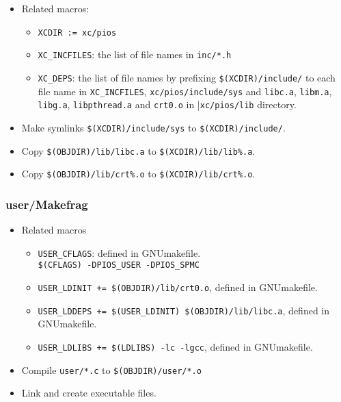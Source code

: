 \begin{itemize}
\item Related macros: 
\begin{itemize}
\item \verb|XCDIR := xc/pios|
\item \verb|XC_INCFILES|: the list of file names in \verb|inc/*.h| 
\item \verb|XC_DEPS|: the list of file names by prefixing \verb|$(XCDIR)/include/| to each file name in \verb|XC_INCFILES|, \verb|xc/pios/include/sys| and \verb|libc.a|, \verb|libm.a|, \verb|libg.a|, \verb|libpthread.a| and \verb|crt0.o| in |\verb|xc/pios/lib| directory.
\end{itemize}
\item Make symlinks \verb|$(XCDIR)/include/sys| to \verb|$(XCDIR)/include/|.
\item Copy \verb|$(OBJDIR)/lib/libc.a| to \verb|$(XCDIR)/lib/lib%.a|.
\item Copy \verb|$(OBJDIR)/lib/crt%.o| to \verb|$(XCDIR)/lib/crt%.o|.
\end{itemize}

\subsubsection{user/Makefrag}
\begin{itemize}
\item Related macros
\begin{itemize}
\item \verb|USER_CFLAGS|: defined in GNUmakefile.
\\\verb|$(CFLAGS) -DPIOS_USER -DPIOS_SPMC|
\item \verb|USER_LDINIT += $(OBJDIR)/lib/crt0.o|, defined in GNUmakefile.
\item \verb|USER_LDDEPS += $(USER_LDINIT) $(OBJDIR)/lib/libc.a|, defined in GNUmakefile.
\item \verb|USER_LDLIBS += $(LDLIBS) -lc -lgcc|, defined in GNUmakefile.
\end{itemize}
\item Compile \verb|user/*.c| to \verb|$(OBJDIR)/user/*.o|
\item Link and create executable files.
\end{itemize}

